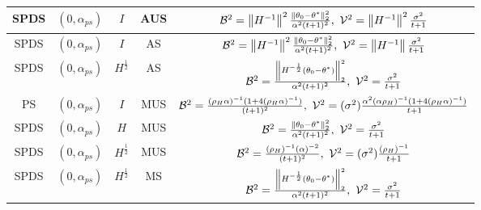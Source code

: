 \begin{table*}
\begin{center}
{\begin{tabular}{|c|c|c|c|c|}
SPDS    & $(0,\alpha_{ps})$     &   $I$     & AUS        &   $\mathcal{B}^2=\left\| H^{-1}\right\|^2\frac{\left\| \theta_0-\theta^*\right\|^2_2}{\alpha^2(t+1)^2},~\mathcal{V}^2=\left\| H^{-1}\right\|^2\frac{\sigma^2}{t+1}$\\ \hline
SPDS    & $(0,\alpha_{ps})$     &   $I$     & AS        &   $\mathcal{B}^2=\left\| H^{-1}\right\|^2\frac{\left\| \theta_0-\theta^*\right\|^2_2}{\alpha^2(t+1)^2},~\mathcal{V}^2=\left\| H^{-1}\right\|\frac{\sigma^2}{t+1}$\\ \hline
SPDS    & $(0,\alpha_{ps})$     &   $H^{\frac{1}{2}}$     &AS        &   $\mathcal{B}^2=\frac{\left\| H^{-\frac{1}{2}}(\theta_0-\theta^*)\right\|^2_2}{\alpha^2(t+1)^2},~\mathcal{V}^2=\frac{\sigma^2}{t+1}$\\ \hline
PS       & $(0,\alpha_{ps})$    &   $I$     & MUS        &   $\mathcal{B}^2=\frac{(\rho_H\alpha)^{-1}(1+4(\rho_H\alpha)^{-1})}{(t+1)^2},~\mathcal{V}^2=(\sigma^2)\frac{\alpha^2(\alpha\rho_H)^{-1}(1+4(\rho_H\alpha)^{-1})}{t+1}$\\ \hline
SPDS    & $(0,\alpha_{ps})$     &   $H$     & MUS        &  $\mathcal{B}^2=\frac{\left\| \theta_0-\theta^*\right\|^2_2}{\alpha^2(t+1)^2},~\mathcal{V}^2=\frac{\sigma^2}{t+1}$\\ \hline
SPDS    & $(0,\alpha_{ps})$     &   $H^{\frac{1}{2}}$     & MUS        &   $\mathcal{B}^2=\frac{(\rho_H)^{-1}(\alpha)^{-2}}{(t+1)^2},~\mathcal{V}^2=(\sigma^2)\frac{(\rho_H)^{-1}}{t+1}$\\ \hline
SPDS    & $(0,\alpha_{ps})$     &   $H^{\frac{1}{2}}$     & MS        &   $\mathcal{B}^2=\frac{\left\| H^{-\frac{1}{2}}(\theta_0-\theta^*)\right\|^2_2}{\alpha^2(t+1)^2},~\mathcal{V}^2=\frac{\sigma^2}{t+1}$\\ \hline
\end{tabular}
}
\end{center}
\end{table*}
